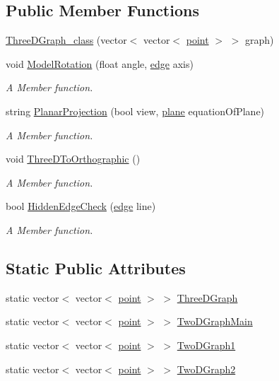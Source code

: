 \subsection*{Public Member Functions}
\begin{DoxyCompactItemize}
\item 
\hyperlink{classThreeDGraph__class_abfa7a7fc904e66a9a76f6b37ba9ca507}{Three\+D\+Graph\+\_\+class} (vector$<$ vector$<$ \hyperlink{structpoint}{point} $>$ $>$ graph)
\item 
void \hyperlink{classThreeDGraph__class_a400bececda29db8682455d92872f0a5e}{Model\+Rotation} (float angle, \hyperlink{structedge}{edge} axis)
\begin{DoxyCompactList}\small\item\em A Member function. \end{DoxyCompactList}\item 
string \hyperlink{classThreeDGraph__class_a38e1e26698241cdc5feb2337b061c997}{Planar\+Projection} (bool view, \hyperlink{structplane}{plane} equation\+Of\+Plane)
\begin{DoxyCompactList}\small\item\em A Member function. \end{DoxyCompactList}\item 
void \hyperlink{classThreeDGraph__class_ae69c2ee22498d903d1afa6b988edd1b6}{Three\+D\+To\+Orthographic} ()
\begin{DoxyCompactList}\small\item\em A Member function. \end{DoxyCompactList}\item 
bool \hyperlink{classThreeDGraph__class_a2cfae37ac914b040194e3dae011454d6}{Hidden\+Edge\+Check} (\hyperlink{structedge}{edge} line)
\begin{DoxyCompactList}\small\item\em A Member function. \end{DoxyCompactList}\end{DoxyCompactItemize}
\subsection*{Static Public Attributes}
\begin{DoxyCompactItemize}
\item 
static vector$<$ vector$<$ \hyperlink{structpoint}{point} $>$ $>$ \hyperlink{classThreeDGraph__class_a31bf9a08590afa88789cf94892d60699}{Three\+D\+Graph}
\item 
static vector$<$ vector$<$ \hyperlink{structpoint}{point} $>$ $>$ \hyperlink{classThreeDGraph__class_afd5d9b6402095228768016568f11e50c}{Two\+D\+Graph\+Main}
\item 
static vector$<$ vector$<$ \hyperlink{structpoint}{point} $>$ $>$ \hyperlink{classThreeDGraph__class_afa4d483e96f88439024919059fb918c6}{Two\+D\+Graph1}
\item 
static vector$<$ vector$<$ \hyperlink{structpoint}{point} $>$ $>$ \hyperlink{classThreeDGraph__class_acbdf53881ff18aeb73301dc1b7dc0880}{Two\+D\+Graph2}
\end{DoxyCompactItemize}



